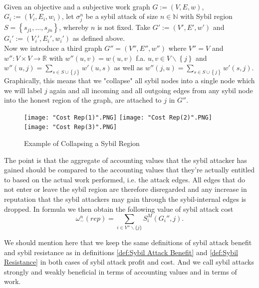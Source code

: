 \begin{definition}\ \\
\label{def:Sybil Attack Cost (rep)}
\noindent{}Given an objective and a subjective work graph $G:=(V,E,w)$, $G_i:=(V_i,E_i,w_i)$, let $\sigma_j^n$ be a sybil attack of size $n\in\mathbb{N}$ with Sybil region $S=\left\lbrace{}s_{j1},\ldots,s_{jn}\right\rbrace$, whereby $n$ is not fixed. Take $G':=(V',E',w')$ and $G_i':=(V_i',E_i',w_i')$ as defined above. \vspace{1em}\\

\noindent{}Now we introduce a third graph $G''=(V'',E'',w'')$ where $V''=V$ and $w'':V\times{}V\rightarrow\mathbb{R}$ with $w''(u,v)=w(u,v)$ f.a. $u,v\in{}V\backslash\left\lbrace{}j\right\rbrace$ and $w''(u,j)=\sum\limits_{s\in{}S\cup\left\lbrace{}j\right\rbrace}w'(u,s)$ as well as $w''(j,u)=\sum\limits_{s\in{}S\cup\left\lbrace{}j\right\rbrace}w'(s,j)$. Graphically, this means that we "collapse" all sybil nodes into a single node which we will label $j$ again and all incoming and all outgoing edges from any sybil node into the honest region of the graph, are attached to $j$ in $G''$. \vspace{1em}\\

\begin{figure}[H]
\begin{center}
\texttt{[image: "Cost Rep(1)".PNG]} 
\texttt{[image: "Cost Rep(2)".PNG]} 
\texttt{[image: "Cost Rep(3)".PNG]}
\end{center}
\label{fig:Example of Collapsing a Sybil Region}
\caption{Example of Collapsing a Sybil Region}
\end{figure}

\noindent{}The point is that the aggregate of accounting values that the sybil attacker has gained should be compared to the accounting values that they're actually entitled to based on the actual work performed, i.e. the attack edges. All edges that do not enter or leave the sybil region are therefore disregarded and any increase in reputation that the sybil attackers may gain through the sybil-internal edges is dropped. In formula we then obtain the following value of sybil attack cost \vspace{1em}\\

\[
\omega_{-}^{n}(rep) = \sum_{i\in{}V''\backslash\lbrace{}j\rbrace}S^M_i(G_i'',j).
\]

\end{definition}

\noindent{}We should mention here that we keep the same definitions of sybil attack benefit and sybil resistance as in definitions \ref{def:Sybil Attack Benefit} and \ref{def:Sybil Resistance} in both cases of sybil attack profit and cost. And we call sybil attacks strongly and weakly beneficial in terms of accounting values and in terms of work. \vspace{1em}\\